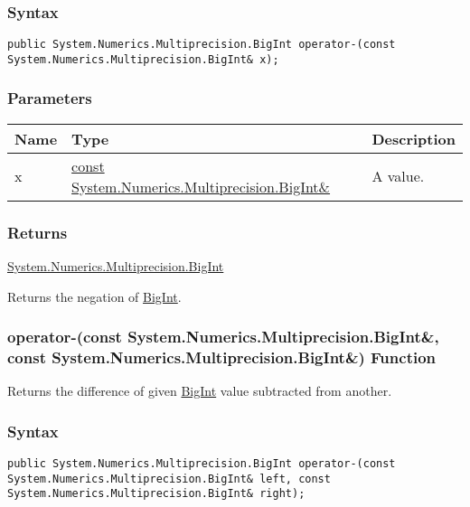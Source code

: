 \documentclass[a4paper,oneside,11.000000pt]{book}
\begin{document}
\subsubsection*{Syntax}
\texttt{public System.Numerics.Multiprecision.BigInt operator-(const System.Numerics.Multiprecision.BigInt\& x);}
\subsubsection*{Parameters}
\begin{flushleft}
\begin{supertabular}[l]{!{\raggedright}p{1.30721cm}!{\raggedright}p{8.55945cm}!{\raggedright}p{2.65538cm}}
\textbf{Name}
& \textbf{Type}
& \textbf{Description}
\\
\hline
x
& \hyperlink{System.Numerics.Multiprecision.BigInt}{const System.\-Numerics.\-Multiprecision.\-BigInt\&\-}
& A value.

\\
\end{supertabular}

\end{flushleft}
\subsubsection*{Returns}
\hyperlink{System.Numerics.Multiprecision.BigInt}{System.\-Numerics.\-Multiprecision.\-BigInt}
\begin{flushleft}
Returns the negation of \hyperlink{System.Numerics.Multiprecision.BigInt}{BigInt}.

\end{flushleft}
\clearpage

\hypertarget{System.Numerics.Multiprecision.operator.minus.C.R.System.Numerics.Multiprecision.BigInt.C.R.System.Numerics.Multiprecision.BigInt}{\subsubsection*{operator-(const System.Numerics.Multiprecision.BigInt\&, const System.Numerics.Multiprecision.BigInt\&) Function}}
\begin{flushleft}
Returns the difference of given \hyperlink{System.Numerics.Multiprecision.BigInt}{BigInt} value subtracted from another.

\end{flushleft}
\subsubsection*{Syntax}
\texttt{public System.Numerics.Multiprecision.BigInt operator-(const System.Numerics.Multiprecision.BigInt\& left, const System.Numerics.Multiprecision.BigInt\& right);}
\end{document}
